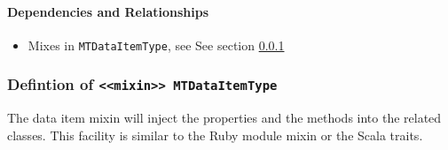 \paragraph{Dependencies and Relationships}

\begin{itemize}
\item Mixes in \texttt{MTDataItemType}, see See section \ref{type:MTDataItemType}
\end{itemize}
\FloatBarrier
\subsubsection{Defintion of \texttt{<<mixin>> MTDataItemType}}
  \label{type:MTDataItemType}

\FloatBarrier

The data item mixin will inject the properties and the methods into the related 
classes. This facility is similar to the Ruby module mixin or the Scala traits.

